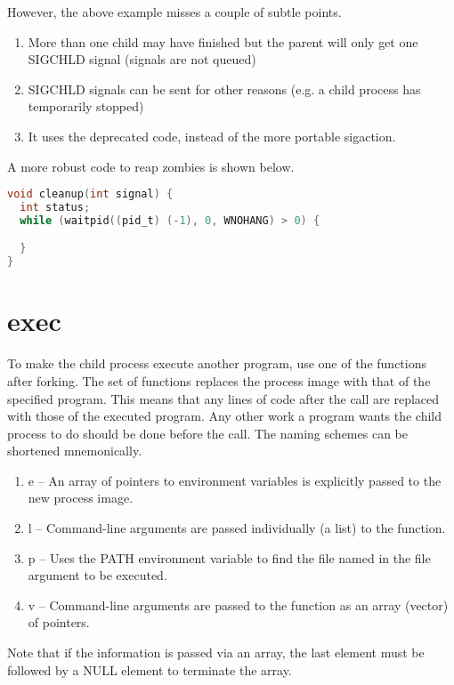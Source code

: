 However, the above example misses a couple of subtle points.
\begin{enumerate}
    \item More than one child may have finished but the parent will only get one SIGCHLD signal (signals are not queued)
    \item SIGCHLD signals can be sent for other reasons (e.g. a child process has temporarily stopped)
    \item It uses the deprecated  code, instead of the more portable sigaction.
\end{enumerate}

A more robust code to reap zombies is shown below.

\begin{lstlisting}[language=C]
void cleanup(int signal) {
  int status;
  while (waitpid((pid_t) (-1), 0, WNOHANG) > 0) {

  }
}
\end{lstlisting}

\section{exec}

To make the child process execute another program, use one of the \href{http://man7.org/linux/man-pages/man3/exec.3.html}{} functions after forking.
The  set of functions replaces the process image with that of the specified program.
This means that any lines of code after the  call are replaced with those of the executed program.
Any other work a program wants the child process to do should be done before the  call.
The naming schemes can be shortened mnemonically.

\begin{enumerate}
    \item e -- An array of pointers to environment variables is explicitly passed to the new process image.
    \item l -- Command-line arguments are passed individually (a list) to the function.
    \item p -- Uses the PATH environment variable to find the file named in the file argument to be executed.
    \item v -- Command-line arguments are passed to the function as an array (vector) of pointers.
\end{enumerate}

Note that if the information is passed via an array, the last element must be followed by a NULL element to terminate the array.

